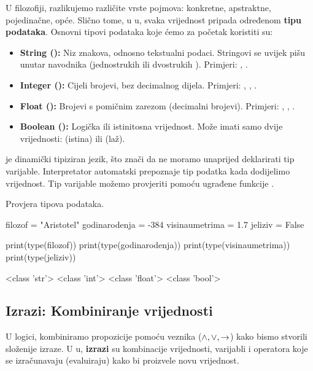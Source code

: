 U filozofiji, razlikujemo različite vrste pojmova: konkretne, apstraktne, pojedinačne, opće. Slično tome, u u, svaka vrijednost pripada određenom \textbf{tipu podataka}. Osnovni tipovi podataka koje ćemo za početak koristiti su:
\begin{itemize}[leftmargin=*]
    \item \textbf{String ():} Niz znakova, odnosno tekstualni podaci. Stringovi se uvijek pišu unutar navodnika (jednostrukih  ili dvostrukih ). Primjeri: , .
    \item \textbf{Integer ():} Cijeli brojevi, bez decimalnog dijela. Primjeri: , , .
    \item \textbf{Float ():} Brojevi s pomičnim zarezom (decimalni brojevi). Primjeri: , , .
    \item \textbf{Boolean ():} Logička ili istinitosna vrijednost. Može imati samo dvije vrijednosti:  (istina) ili  (laž).
\end{itemize}

 je dinamički tipiziran jezik, što znači da ne moramo unaprijed deklarirati tip varijable. Interpretator automatski prepoznaje tip podatka kada dodijelimo vrijednost. Tip varijable možemo provjeriti pomoću ugrađene funkcije .

\begin{primjerokvir}
    Provjera tipova podataka.
    \begin{pythoncode}
filozof = "Aristotel"
godinarodenja = -384
visinaumetrima = 1.7
jeliziv = False

print(type(filozof))
print(type(godinarodenja))
print(type(visinaumetrima))
print(type(jeliziv))
    \end{pythoncode}
    \begin{codeoutput}
<class 'str'>
<class 'int'>
<class 'float'>
<class 'bool'>
    \end{codeoutput}
\end{primjerokvir}

\subsection{Izrazi: Kombiniranje vrijednosti}

U logici, kombiniramo propozicije pomoću veznika ($\land, \lor, \rightarrow$) kako bismo stvorili složenije izraze. U u, \textbf{izrazi} su kombinacije vrijednosti, varijabli i operatora koje se izračunavaju (evaluiraju) kako bi proizvele novu vrijednost.


